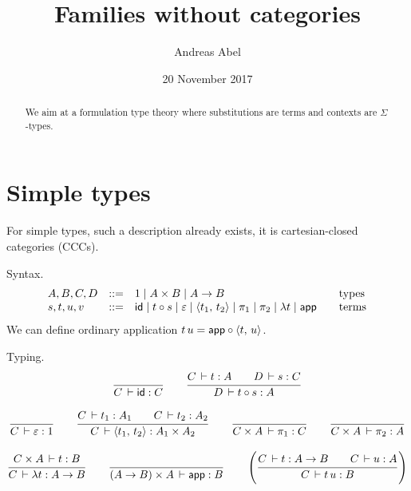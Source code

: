 \documentclass{article}
\title{Families without categories}
\author{Andreas Abel}
\date{20 November 2017}
\newcommand{\pair}[2]{\langle#1,\,#2\rangle}
\newcommand{\eps}{\varepsilon}
\newcommand{\emp}{\eps}
\begin{document}
\maketitle

\begin{abstract}
We aim at a formulation type theory where substitutions are terms and
contexts are $\Sigma$-types.
\end{abstract}

\section{Simple types}

For simple types, such a description already exists, it is
cartesian-closed categories (CCCs).

Syntax.
\[
\begin{array}{lrl@{\qquad}l}
  A,B,C,D & ::= & 1 \mid A \times B \mid A \to B & \mbox{types} \\
  s,t,u,v & ::= & \tid \mid t \comp s \mid \emp \mid \pair{t_1}{t_2} \mid \pi_1 \mid \pi_2 \mid
                \lambda t \mid \tapp & \mbox{terms}
\end{array}
\]
We can define ordinary application $t\,u = \tapp \comp \pair t u$.

Typing. 
\begin{gather*}
  \ru{}{C \der \tid : C}
\qquad
  \ru{C \der t : A \qquad D \der s : C
    }{D \der t \comp s : A}
\\[2ex]
  \ru{}{C \der \emp : 1}
\qquad
  \ru{C \der t_1 : A_1 \qquad
      C \der t_2 : A_2
    }{C \der \pair{t_1}{t_2} : A_1 \times A_2}
\qquad
  \ru{}{C \times A \der \pi_1 : C}
\qquad
  \ru{}{C \times A \der \pi_2 : A}
\\[2ex]
  \ru{C \times A \der t : B
    }{C \der \lambda t : A \to B}
\qquad
  \ru{}{(A \to B) \times A \der \tapp : B}
\qquad
  \left(
  \ru{C \der t : A \to B \qquad
      C \der u : A
    }{C \der t\,u : B}
  \right)
\end{gather*}
\end{document}
